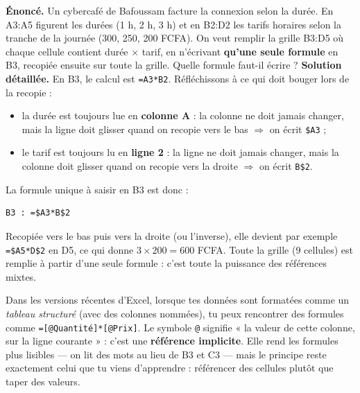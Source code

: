 \documentclass[11pt]{article}
\begin{document}
\begin{exoresolu}
\textbf{Énoncé.} Un cybercafé de Bafoussam facture la connexion selon la durée. En A3:A5 figurent les durées (1 h, 2 h, 3 h) et en B2:D2 les tarifs horaires selon la tranche de la journée (300, 250, 200 FCFA). On veut remplir la grille B3:D5 où chaque cellule contient durée $\times$ tarif, en n'écrivant \textbf{qu'une seule formule} en B3, recopiée ensuite sur toute la grille. Quelle formule faut-il écrire ?
\tcblower
\textbf{Solution détaillée.} En B3, le calcul est \texttt{=A3*B2}. Réfléchissons à ce qui doit bouger lors de la recopie :
\begin{itemize}
\item la durée est toujours lue en \textbf{colonne A} : la colonne ne doit jamais changer, mais la ligne doit glisser quand on recopie vers le bas $\Rightarrow$ on écrit \texttt{\$A3} ;
\item le tarif est toujours lu en \textbf{ligne 2} : la ligne ne doit jamais changer, mais la colonne doit glisser quand on recopie vers la droite $\Rightarrow$ on écrit \texttt{B\$2}.
\end{itemize}
La formule unique à saisir en B3 est donc :
\begin{lstlisting}
B3 : =$A3*B$2
\end{lstlisting}
Recopiée vers le bas puis vers la droite (ou l'inverse), elle devient par exemple \texttt{=\$A5*D\$2} en D5, ce qui donne $3 \times 200 = 600$ FCFA. Toute la grille (9 cellules) est remplie à partir d'une seule formule : c'est toute la puissance des références mixtes.
\end{exoresolu}

\begin{savaistu}
Dans les versions récentes d'Excel, lorsque tes données sont formatées comme un \emph{tableau structuré} (avec des colonnes nommées), tu peux rencontrer des formules comme \texttt{=[@Quantité]*[@Prix]}. Le symbole \texttt{@} signifie « la valeur de cette colonne, sur la ligne courante » : c'est une \textbf{référence implicite}. Elle rend les formules plus lisibles — on lit des mots au lieu de B3 et C3 — mais le principe reste exactement celui que tu viens d'apprendre : référencer des cellules plutôt que taper des valeurs.
\end{savaistu}
\end{document}
